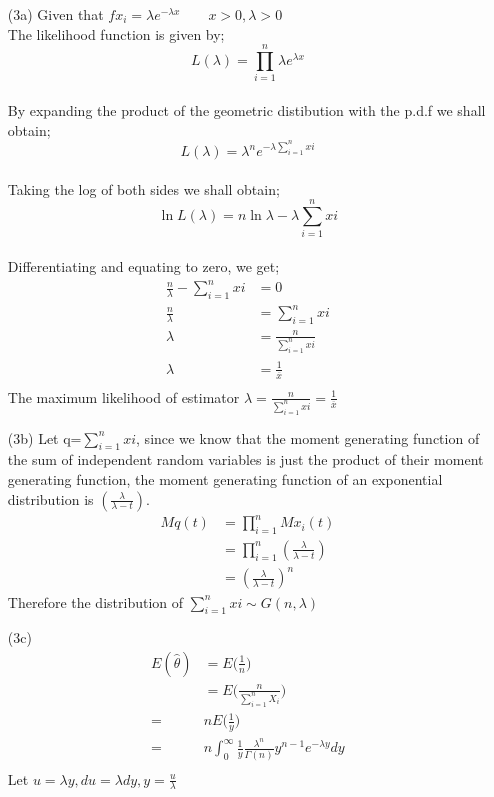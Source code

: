 \documentclass[12pt,a4paper]{article}
\begin{document}
\begin{itemize}
\newpage
\item[(3a)] Given that $fx_{i}=\lambda e^{-\lambda x}\quad \quad x>0, \lambda>0$\\
The likelihood function is given by;
$$L(\lambda)=\prod _{i=1}^{n}\lambda e^{\lambda x}$$\\
By expanding the product of the geometric distibution with the p.d.f we shall obtain;
$$L(\lambda)=\lambda ^{n} e^{-\lambda \sum \limits_{i=1}^{n}xi}$$\\
Taking the log of both sides we shall obtain;
$$\ln {L(\lambda)}=n \ln{\lambda}-\lambda \sum \limits_{i=1}^{n} xi$$\\
Differentiating and equating to zero, we get;
\begin{align*}
\frac{n}{\lambda}- \sum \limits_{i=1}^{n} xi &= 0\\
\frac{n}{\lambda}&= \sum \limits_{i=1}^{n} xi\\
\lambda &=\frac{n}{\sum \limits_{i=1}^{n} xi}\\
\hat{\lambda}&=\frac{1}{\overline{x}}\\
\end{align*}
The maximum likelihood of estimator \quad$\lambda =\frac{n}{\sum \limits_{i=1}^{n} xi}=\frac{1}{\overline{x}}$
\item[(3b)] Let q=$\sum \limits_{i=1}^{n} xi$, since we know that the moment generating function of the sum of independent random variables is just the product of their moment generating function, the moment generating function of an exponential distribution is $\left(\frac{\lambda}{\lambda-t}\right)$.
\begin{align*}
Mq(t)&=\prod _{i=1}^{n}Mx_{i}(t)\\
&=\prod _{i=1}^{n}\left(\frac{\lambda}{\lambda-t}\right)\\
&=\left(\frac{\lambda}{\lambda-t}\right)^{n}
\end{align*}
Therefore the distribution of $\sum \limits_{i=1}^{n} xi\sim G\left(n,\lambda\right)$
\newpage
\item[(3c)]
	\begin{align*}
	E(\hat{\theta}) &= E\bigg(\frac{1}{n}\bigg)\\
	&= E\bigg(\frac{n}{\sum_{i=1}^{n}X_i}\bigg)\\
	=& nE\bigg(\frac{1}{y}\bigg)\\
	=& n\int_{0}^{\infty}\frac{1}{y}\frac{\lambda ^n}{\varGamma(n)}y^{n-1}e^{-\lambda y}dy\\
	\end{align*}
	Let $u=\lambda y ,du =\lambda dy ,y = \frac{u}{\lambda}$		

\end{itemize}
\end{document}
